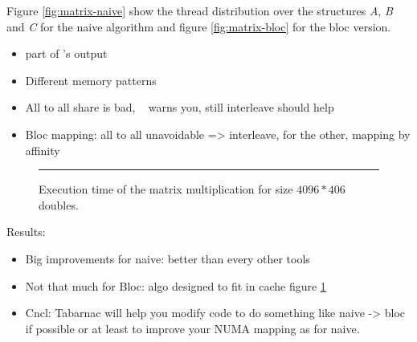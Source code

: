 Figure \ref{fig:matrix-naive} show the thread distribution over the
structures \emph{A}, \emph{B} and \emph{C} for the naive algorithm and figure
\ref{fig:matrix-bloc} for the bloc version.
\begin{itemize}
    \item part of \TABARNAC's output
    \item Different memory patterns
    \item All to all share is bad, \TABARNAC~ warns you, still interleave
        should help
    \item Bloc mapping: all to all unavoidable => interleave, for the other,
        mapping by affinity
\end{itemize}

\begin{figure}[htb]
    \centering
    \rule{4cm}{4cm}
    \caption{Execution time of the matrix multiplication for size $4096*406$ doubles.}
    \label{fig:matrix-res}
\end{figure}

Results:
\begin{itemize}
    \item Big improvements for naive: better than every other tools
    \item Not that much for Bloc: algo designed to fit in cache figure
        \ref{fig:matrix-res}
    \item Cncl: Tabarnac will help you modify code to do something like naive
        -> bloc if possible or at least to improve your NUMA mapping as for
        naive.
\end{itemize}

